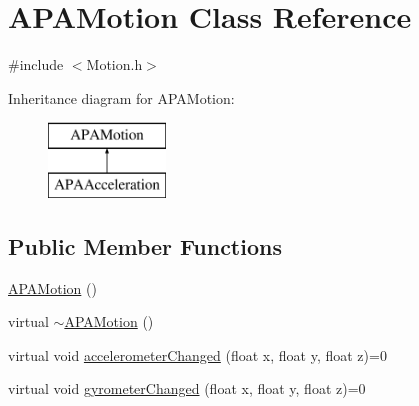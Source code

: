 \hypertarget{class_a_p_a_motion}{\section{A\+P\+A\+Motion Class Reference}
\label{class_a_p_a_motion}
}


{\ttfamily \#include $<$Motion.\+h$>$}

Inheritance diagram for A\+P\+A\+Motion\+:\begin{figure}[H]
\begin{center}
\leavevmode
\includegraphics[height=2.000000cm]{class_a_p_a_motion}
\end{center}
\end{figure}
\subsection*{Public Member Functions}
\begin{DoxyCompactItemize}
\item 
\hyperlink{class_a_p_a_motion_a929c72a677d5543b0cf2a19707a9e163}{A\+P\+A\+Motion} ()
\item 
virtual \hyperlink{class_a_p_a_motion_ae074f8b140ce4fe8febbe695f07c015d}{$\sim$\+A\+P\+A\+Motion} ()
\item 
virtual void \hyperlink{class_a_p_a_motion_a6d6cd5ac438aabf7a60a080c1632dc10}{accelerometer\+Changed} (float x, float y, float z)=0
\item 
virtual void \hyperlink{class_a_p_a_motion_a79ca82357e31f95ed8de484a6e3e3882}{gyrometer\+Changed} (float x, float y, float z)=0
\end{DoxyCompactItemize}


